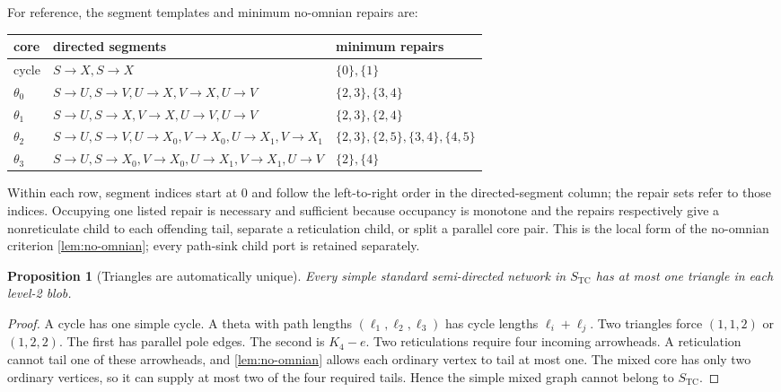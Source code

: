 \documentclass[11pt]{article}
\newtheorem{proposition}[theorem]{Proposition}
\theoremstyle{remark}
\newcommand{\TCs}{S_{\mathrm{TC}}}
\begin{document}


For reference, the segment templates and minimum no-omnian repairs are:
\begin{center}
\small
\begin{tabular}{lll}
\toprule
core & directed segments & minimum repairs\\
\midrule
cycle & $S\!\to X,S\!\to X$ & $\{0\},\{1\}$\\
$\theta_0$ & $S\!\to U,S\!\to V,U\!\to X,V\!\to X,U\!\to V$
 & $\{2,3\},\{3,4\}$\\
$\theta_1$ & $S\!\to U,S\!\to X,V\!\to X,U\!\to V,U\!\to V$
 & $\{2,3\},\{2,4\}$\\
$\theta_2$ & $S\!\to U,S\!\to V,U\!\to X_0,V\!\to X_0,
U\!\to X_1,V\!\to X_1$
 & $\{2,3\},\{2,5\},\{3,4\},\{4,5\}$\\
$\theta_3$ & $S\!\to U,S\!\to X_0,V\!\to X_0,U\!\to X_1,
V\!\to X_1,U\!\to V$
 & $\{2\},\{4\}$\\
\bottomrule
\end{tabular}
\end{center}
Within each row, segment indices start at $0$ and follow the left-to-right
order in the directed-segment column; the repair sets refer to those indices.
Occupying one listed repair is necessary and sufficient because occupancy is
monotone and the repairs respectively give a nonreticulate child to each
offending tail, separate a reticulation child, or split a parallel core pair.
This is the local form of the no-omnian criterion
\cref{lem:no-omnian}; every path-sink child port is retained separately.

\begin{proposition}[Triangles are automatically unique]\label{prop:one-triangle}
Every simple standard semi-directed network in $\TCs$ has at most one
triangle in each level-2 blob.
\end{proposition}

\begin{proof}
A cycle has one simple cycle.  A theta with path lengths
$(\ell_1,\ell_2,\ell_3)$ has cycle lengths $\ell_i+\ell_j$.  Two triangles
force $(1,1,2)$ or $(1,2,2)$.  The first has parallel pole edges.  The second
is $K_4-e$.  Two reticulations require four incoming arrowheads.  A
reticulation cannot tail one of these arrowheads, and
\cref{lem:no-omnian} allows each ordinary vertex to tail at most one.  The
mixed core has only two ordinary vertices, so it can supply at most two of
the four required tails.  Hence the simple mixed graph cannot belong to
$\TCs$.
\end{proof}
\end{document}
